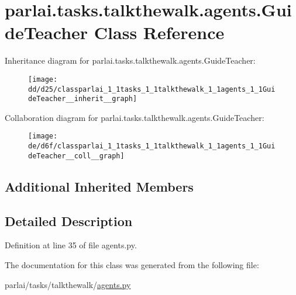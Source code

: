 \hypertarget{classparlai_1_1tasks_1_1talkthewalk_1_1agents_1_1GuideTeacher}{}\section{parlai.\+tasks.\+talkthewalk.\+agents.\+Guide\+Teacher Class Reference}
\label{classparlai_1_1tasks_1_1talkthewalk_1_1agents_1_1GuideTeacher}


Inheritance diagram for parlai.\+tasks.\+talkthewalk.\+agents.\+Guide\+Teacher\+:\nopagebreak
\begin{figure}[H]
\begin{center}
\leavevmode
\texttt{[image: dd/d25/classparlai\_1\_1tasks\_1\_1talkthewalk\_1\_1agents\_1\_1GuideTeacher\_\_inherit\_\_graph]}
\end{center}
\end{figure}


Collaboration diagram for parlai.\+tasks.\+talkthewalk.\+agents.\+Guide\+Teacher\+:\nopagebreak
\begin{figure}[H]
\begin{center}
\leavevmode
\texttt{[image: de/d6f/classparlai\_1\_1tasks\_1\_1talkthewalk\_1\_1agents\_1\_1GuideTeacher\_\_coll\_\_graph]}
\end{center}
\end{figure}
\subsection*{Additional Inherited Members}


\subsection{Detailed Description}


Definition at line 35 of file agents.\+py.



The documentation for this class was generated from the following file\+:\begin{DoxyCompactItemize}
\item 
parlai/tasks/talkthewalk/\hyperlink{parlai_2tasks_2talkthewalk_2agents_8py}{agents.\+py}\end{DoxyCompactItemize}
